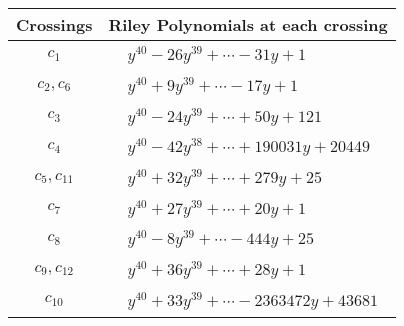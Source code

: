 \documentclass[1p]{elsarticle_modified}
\theoremstyle{definition}
\begin{document}
\begin{tabular}{m{50pt}|m{274pt}}
Crossings & \hspace{64pt}Riley Polynomials at each crossing \\
\hline $$\begin{aligned}c_{1}\end{aligned}$$&$\begin{aligned}
&y^{40}-26 y^{39}+\cdots-31 y+1
\end{aligned}$\\
\hline $$\begin{aligned}c_{2},c_{6}\end{aligned}$$&$\begin{aligned}
&y^{40}+9 y^{39}+\cdots-17 y+1
\end{aligned}$\\
\hline $$\begin{aligned}c_{3}\end{aligned}$$&$\begin{aligned}
&y^{40}-24 y^{39}+\cdots+50 y+121
\end{aligned}$\\
\hline $$\begin{aligned}c_{4}\end{aligned}$$&$\begin{aligned}
&y^{40}-42 y^{38}+\cdots+190031 y+20449
\end{aligned}$\\
\hline $$\begin{aligned}c_{5},c_{11}\end{aligned}$$&$\begin{aligned}
&y^{40}+32 y^{39}+\cdots+279 y+25
\end{aligned}$\\
\hline $$\begin{aligned}c_{7}\end{aligned}$$&$\begin{aligned}
&y^{40}+27 y^{39}+\cdots+20 y+1
\end{aligned}$\\
\hline $$\begin{aligned}c_{8}\end{aligned}$$&$\begin{aligned}
&y^{40}-8 y^{39}+\cdots-444 y+25
\end{aligned}$\\
\hline $$\begin{aligned}c_{9},c_{12}\end{aligned}$$&$\begin{aligned}
&y^{40}+36 y^{39}+\cdots+28 y+1
\end{aligned}$\\
\hline $$\begin{aligned}c_{10}\end{aligned}$$&$\begin{aligned}
&y^{40}+33 y^{39}+\cdots-2363472 y+43681
\end{aligned}$\\
\hline
\end{tabular}\\~\\
\end{document}
